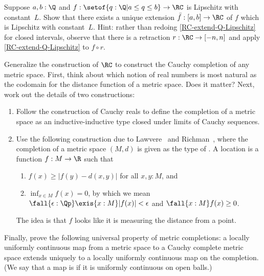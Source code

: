 \begin{ex} \label{RC-Lipschitz-on-interval} Suppose $a, b : \Q$ and $f : \setof{ q : \Q |
    a \leq q \leq b } \to \RC$ is Lipschitz with constant~$L$. Show that there exists a unique
  extension $\bar{f} : [a,b] \to \RC$ of $f$ which is Lipschitz with
  constant~$L$. Hint: rather than redoing \cref{RC-extend-Q-Lipschitz} for closed
  intervals, observe that there is a retraction $r : \RC \to [-n,n]$ and apply
  \cref{RC-extend-Q-Lipschitz} to $f \circ r$.
\end{ex}

\begin{ex} \label{ex:metric-completion}
  Generalize the construction of $\RC$ to construct the Cauchy completion of any metric space. First, think about which notion of real numbers is most natural as the codomain for the distance function of a metric space. Does it matter? Next, work out the details of two constructions:
  \begin{enumerate}
  \item Follow the construction of Cauchy reals to define the completion of a metric space as an inductive-inductive type closed under limits of Cauchy sequences.
  \item Use the following construction due to Lawvere~\cite{lawvere:metric-spaces} and Richman~\cite{Richman00thefundamental}, where the completion of a metric space $(M, d)$ is given as the type of .
    A location is a function $f : M \to \R$ such that
    \begin{enumerate}
    \item $f(x) \geq |f(y) - d(x,y)|$ for all $x, y : M$, and
    \item $\inf_{x \in M} f(x) = 0$, by which we mean $\fall{\epsilon : \Qp} \exis{x : M} |f(x)| < \epsilon$ and $\fall{x : M} f(x) \geq 0$.
    \end{enumerate}
    The idea is that $f$ looks like it is measuring the distance from a point.
  \end{enumerate}
  Finally, prove the following universal property of metric completions: a locally uniformly continuous map from a metric space to a Cauchy complete metric space extends uniquely to a locally uniformly continuous map on the completion. (We say that a map is 
  if it is uniformly continuous on open balls.)
\end{ex}

